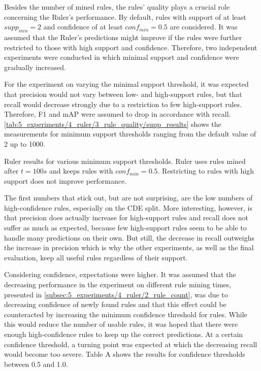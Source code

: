 Besides the number of mined rules, the rules' quality plays a crucial role concerning the Ruler's performance. By default, rules with support of at least $supp_{min} = 2$ and confidence of at least $conf_{min} = 0.5$ are considered. It was assumed that the Ruler's predictions might improve if the rules were further restricted to those with high support and confidence. Therefore, two independent experiments were conducted in which minimal support and confidence were gradually increased.

For the experiment on varying the minimal support threshold, it was expected that precision would not vary between low- and high-support rules, but that recall would decrease strongly due to a restriction to few high-support rules. Therefore, F1 and mAP were assumed to drop in accordance with recall. \autoref{tab:5_experiments/4_ruler/3_rule_quality/supp_results} shows the measurements for minimum support thresholds ranging from the default value of 2 up to 1000.

\begin{table}
    \makebox[\textwidth][c]{
        
    }
    \caption{Ruler results for various minimum support thresholds. Ruler uses rules mined after $t = 100s$ and keeps rules with $conf_{min} = 0.5$. Restricting to rules with high support does not improve performance.}
    \label{tab:5_experiments/4_ruler/3_rule_quality/supp_results}
\end{table}

The first numbers that stick out, but are not surprising, are the low numbers of high-confidence rules, especially on the CDE split. More interesting, however, is that precision does actually increase for high-support rules and recall does not suffer as much as expected, because few high-support rules seem to be able to handle many predictions on their own. But still, the decrease in recall outweighs the increase in precision which is why the other experiments, as well as the final evaluation, keep all useful rules regardless of their support.

Considering confidence, expectations were higher. It was assumed that the decreasing performance in the experiment on different rule mining times, presented in \autoref{subsec:5_experiments/4_ruler/2_rule_count}, was due to decreasing confidence of newly found rules and that this effect could be counteracted by increasing the minimum confidence threshold for rules. While this would reduce the number of usable rules, it was hoped that there were enough high-confidence rules to keep up the correct predictions. At a certain confidence threshold, a turning point was expected at which the decreasing recall would become too severe. Table A shows the results for confidence thresholds between 0.5 and 1.0.

